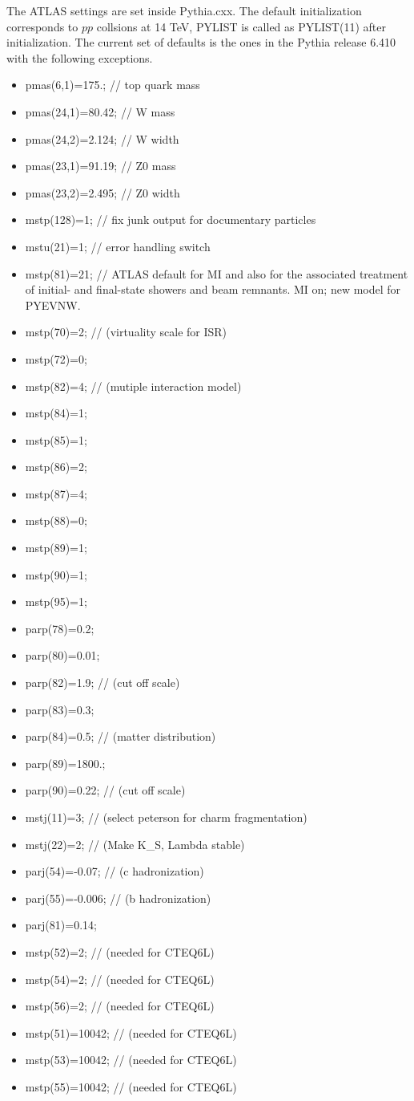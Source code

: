 \documentclass[11pt]{article}
\begin{document}
The ATLAS settings are set inside Pythia.cxx. The default initialization corresponds to $pp$ collsions at 14 TeV, PYLIST is called 
as PYLIST(11) after initialization.
The current set of defaults is the ones in the Pythia release 6.410 with the 
following exceptions.
\begin{itemize}
\item pmas(6,1)=175.;  // top quark mass
\item pmas(24,1)=80.42; // W mass
\item pmas(24,2)=2.124; // W width
\item pmas(23,1)=91.19; // Z0 mass
\item pmas(23,2)=2.495; // Z0 width
\item mstp(128)=1;     // fix junk output for documentary particles
\item mstu(21)=1;     // error handling switch
\item mstp(81)=21; // ATLAS default for MI and also for the associated
treatment of initial- and final-state showers and beam remnants. MI on; new model for PYEVNW.
\item mstp(70)=2;      // (virtuality scale for ISR)
\item mstp(72)=0;
\item mstp(82)=4;      // (mutiple interaction model)
\item mstp(84)=1;
\item mstp(85)=1;
\item mstp(86)=2;
\item mstp(87)=4;
\item mstp(88)=0;
\item mstp(89)=1;
\item mstp(90)=1;
\item mstp(95)=1;
\item parp(78)=0.2;
\item parp(80)=0.01;
\item parp(82)=1.9;    // (cut off scale)
\item parp(83)=0.3;
\item parp(84)=0.5;    // (matter distribution)
\item parp(89)=1800.;
\item parp(90)=0.22;   // (cut off scale)
\item mstj(11)=3;      // (select peterson for charm fragmentation)
\item mstj(22)=2;      // (Make K\_S, Lambda stable)
\item parj(54)=-0.07;  // (c hadronization)
\item parj(55)=-0.006; // (b hadronization)
\item parj(81)=0.14;
\item mstp(52)=2;      // (needed for CTEQ6L)
\item mstp(54)=2;      // (needed for CTEQ6L)
\item mstp(56)=2;      // (needed for CTEQ6L)
\item mstp(51)=10042;  // (needed for CTEQ6L)
\item mstp(53)=10042;  // (needed for CTEQ6L)
\item mstp(55)=10042;  // (needed for CTEQ6L)
\end{itemize}
\end{document}
